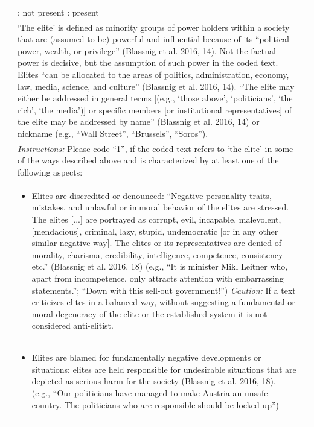 \documentclass[
]{ccr}
\begin{document}
{\begin{spacing}{1}
\begin{longtable}[]{@{}
  >{\raggedright\arraybackslash}p{.14\linewidth}
  >{\raggedright\arraybackslash}p{.62\linewidth}
  >{\raggedright\arraybackslash}p{.13\linewidth}@{}}
& 
0: not present \newline
1: present
\\
& 
‘The elite’ is defined as minority groups of power holders within a society that are (assumed to be) powerful and influential because of its “political power, wealth, or privilege” (Blassnig et al. 2016, 14). Not the factual power is decisive, but the assumption of such power in the coded text. Elites “can be allocated to the areas of politics, administration, economy, law, media, science, and culture” (Blassnig et al. 2016, 14). “The elite may either be addressed in general terms [(e.g., ‘those above’, ‘politicians’, ‘the rich’, ‘the media’)] or specific members [or institutional representatives] of the elite may be addressed by name” (Blassnig et al. 2016, 14) or nickname (e.g., “Wall Street”, “Brussels”, “Soros”).
& 
\\
&
\emph{Instructions:} \newline
Please code “1”, if the coded text refers to ‘the elite’ in some of the ways described above and is characterized by at least one of the following aspects: \newline
&
\\
&
\begin{itemize}
\item Elites are discredited or denounced: “Negative personality traits, mistakes, and unlawful or immoral behavior of the elites are stressed. The elites [...] are portrayed as corrupt, evil, incapable, malevolent, [mendacious], criminal, lazy, stupid, undemocratic [or in any other similar negative way]. The elites or its representatives are denied of morality, charisma, credibility, intelligence, competence, consistency etc.” (Blassnig et al. 2016, 18) (e.g., “It is minister Mikl Leitner who, apart from incompetence, only attracts attention with embarrassing statements.”; “Down with this sell-out government!”) \newline
\emph{Caution:} If a text criticizes elites in a balanced way, without suggesting a fundamental or moral degeneracy of the elite or the established system it is not considered anti-elitist. 
\end{itemize}
\\
&
\begin{itemize}\item Elites are blamed for fundamentally negative developments or situations: elites are held responsible for undesirable situations that are depicted as serious harm for the society (Blassnig et al. 2016, 18). (e.g., “Our politicians have managed to make Austria an unsafe country. The politicians who are responsible should be locked up”)

\end{itemize}
\end{longtable}
\end{spacing}}
\end{document}
